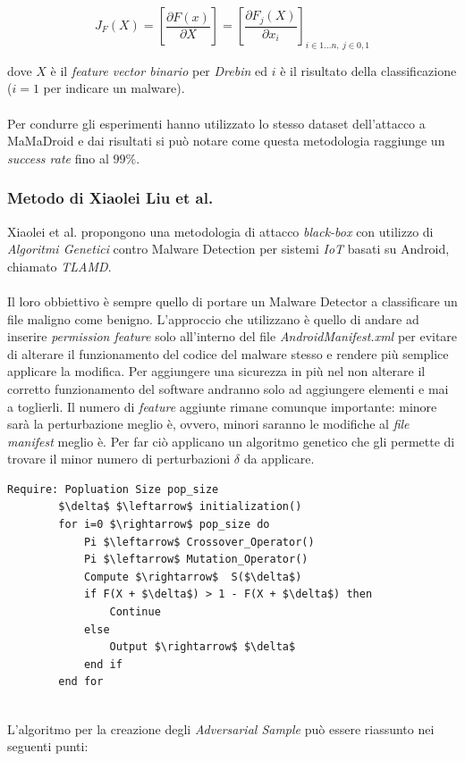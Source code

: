 \[
    J_F(X) = [ \frac{\partial F(x)}{\partial X} ] = [ \frac{\partial F_j(X)}{\partial x_i} ]_{i \in 1 \ldots n, \ j \in 0, 1}
\]

dove \(X\) è il \textit{feature vector binario} per \textit{Drebin} ed \(i\) è il risultato della classificazione (\(i = 1\) per indicare un malware).\\
\\
Per condurre gli esperimenti hanno utilizzato lo stesso dataset dell'attacco a MaMaDroid e dai risultati si può notare come questa metodologia raggiunge un \textit{success rate} fino al \(99\%\)\cite{hiv}.

\subsubsection{Metodo di Xiaolei Liu et al.}
Xiaolei et al.\cite{iot} propongono una metodologia di attacco \textit{black-box} con utilizzo di \textit{Algoritmi Genetici} contro Malware Detection per sistemi \textit{IoT} basati su Android, chiamato \textit{TLAMD}.\\
\\
Il loro obbiettivo è sempre quello di portare un Malware Detector a classificare un file maligno come benigno. L'approccio che utilizzano è quello di andare ad inserire \textit{permission feature}\cite{iot} solo all'interno del file \textit{AndroidManifest.xml} per evitare di alterare il funzionamento del codice del malware stesso e rendere più semplice applicare la modifica. Per aggiungere una sicurezza in più nel non alterare il corretto funzionamento del software andranno solo ad aggiungere elementi e mai a toglierli. Il numero di \textit{feature} aggiunte rimane comunque importante: minore sarà la perturbazione meglio è, ovvero, minori saranno le modifiche al \textit{file manifest} meglio è. Per far ciò applicano un algoritmo genetico che gli permette di trovare il minor numero di perturbazioni \(\delta\) da applicare.

\begin{lstlisting}[caption=Pseudocodice per la generazione di un \textit{Adversarial Sample}\cite{iot}, mathescape=true]
    Require: Popluation Size pop_size 
        $\delta$ $\leftarrow$ initialization()
        for i=0 $\rightarrow$ pop_size do
            Pi $\leftarrow$ Crossover_Operator()
            Pi $\leftarrow$ Mutation_Operator() 
            Compute $\rightarrow$  S($\delta$)
            if F(X + $\delta$) > 1 - F(X + $\delta$) then
                Continue
            else
                Output $\rightarrow$ $\delta$
            end if
        end for
\end{lstlisting}
\ \\
L'algoritmo per la creazione degli \textit{Adversarial Sample} può essere riassunto nei seguenti punti\cite{iot}:

